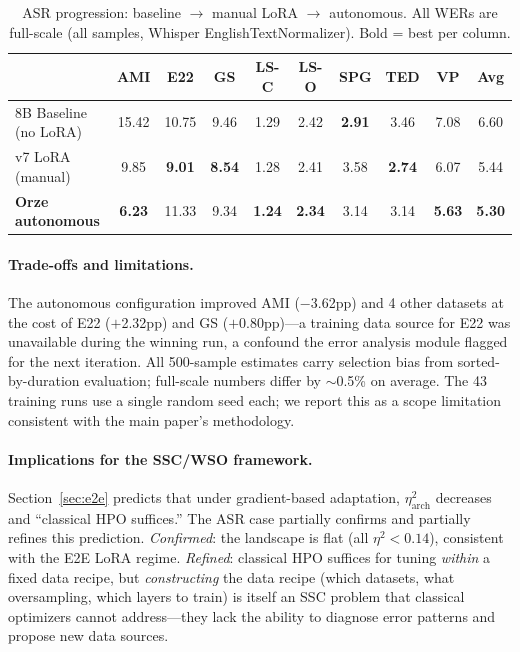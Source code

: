 \documentclass{article}
\begin{document}
\begin{table}[ht]
\centering
\caption{ASR progression: baseline $\to$ manual LoRA $\to$ autonomous. All WERs are full-scale (all samples, Whisper EnglishTextNormalizer). Bold = best per column.}
\label{tab:asr_results}
\small
\begin{tabular}{@{}lccccccccc@{}}
\toprule
& AMI & E22 & GS & LS-C & LS-O & SPG & TED & VP & \textbf{Avg} \\
\midrule
8B Baseline (no LoRA) & 15.42 & 10.75 & 9.46 & 1.29 & 2.42 & \textbf{2.91} & 3.46 & 7.08 & 6.60 \\
v7 LoRA (manual) & 9.85 & \textbf{9.01} & \textbf{8.54} & 1.28 & 2.41 & 3.58 & \textbf{2.74} & 6.07 & 5.44 \\
\textbf{Orze autonomous} & \textbf{6.23} & 11.33 & 9.34 & \textbf{1.24} & \textbf{2.34} & 3.14 & 3.14 & \textbf{5.63} & \textbf{5.30} \\
\bottomrule
\end{tabular}
\end{table}

\paragraph{Trade-offs and limitations.}
The autonomous configuration improved AMI ($-$3.62pp) and 4 other datasets at the cost of E22 ($+$2.32pp) and GS ($+$0.80pp)---a training data source for E22 was unavailable during the winning run, a confound the error analysis module flagged for the next iteration.
All 500-sample estimates carry selection bias from sorted-by-duration evaluation; full-scale numbers differ by $\sim$0.5\% on average.
The 43 training runs use a single random seed each; we report this as a scope limitation consistent with the main paper's methodology.

\paragraph{Implications for the SSC/WSO framework.}
Section~\ref{sec:e2e} predicts that under gradient-based adaptation, $\eta^2_{\mathrm{arch}}$ decreases and ``classical HPO suffices.''
The ASR case partially confirms and partially refines this prediction.
\emph{Confirmed}: the landscape is flat (all $\eta^2 < 0.14$), consistent with the E2E LoRA regime.
\emph{Refined}: classical HPO suffices for tuning \emph{within} a fixed data recipe, but \emph{constructing} the data recipe (which datasets, what oversampling, which layers to train) is itself an SSC problem that classical optimizers cannot address---they lack the ability to diagnose error patterns and propose new data sources.
\end{document}
